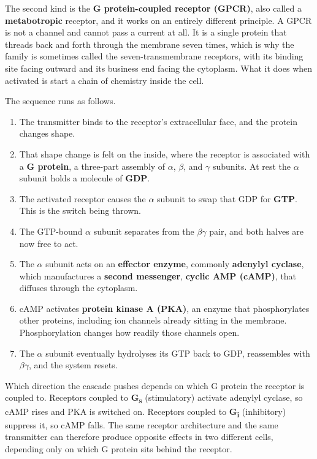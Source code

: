 \documentclass[11pt]{article}
\begin{document}
The second kind is the \textbf{G protein-coupled receptor (GPCR)}, also called a \textbf{metabotropic} receptor, and it works on an entirely different principle. A GPCR is not a channel and cannot pass a current at all. It is a single protein that threads back and forth through the membrane seven times, which is why the family is sometimes called the seven-transmembrane receptors, with its binding site facing outward and its business end facing the cytoplasm. What it does when activated is start a chain of chemistry inside the cell.

The sequence runs as follows.

\begin{enumerate}
    \item The transmitter binds to the receptor's extracellular face, and the protein changes shape.
    \item That shape change is felt on the inside, where the receptor is associated with a \textbf{G protein}, a three-part assembly of $\alpha$, $\beta$, and $\gamma$ subunits. At rest the $\alpha$ subunit holds a molecule of \textbf{GDP}.
    \item The activated receptor causes the $\alpha$ subunit to swap that GDP for \textbf{GTP}. This is the switch being thrown.
    \item The GTP-bound $\alpha$ subunit separates from the $\beta\gamma$ pair, and both halves are now free to act.
    \item The $\alpha$ subunit acts on an \textbf{effector enzyme}, commonly \textbf{adenylyl cyclase}, which manufactures a \textbf{second messenger}, \textbf{cyclic AMP (cAMP)}, that diffuses through the cytoplasm.
    \item cAMP activates \textbf{protein kinase A (PKA)}, an enzyme that phosphorylates other proteins, including ion channels already sitting in the membrane. Phosphorylation changes how readily those channels open.
    \item The $\alpha$ subunit eventually hydrolyses its GTP back to GDP, reassembles with $\beta\gamma$, and the system resets.
\end{enumerate}

Which direction the cascade pushes depends on which G protein the receptor is coupled to. Receptors coupled to \textbf{G\textsubscript{s}} (stimulatory) activate adenylyl cyclase, so cAMP rises and PKA is switched on. Receptors coupled to \textbf{G\textsubscript{i}} (inhibitory) suppress it, so cAMP falls. The same receptor architecture and the same transmitter can therefore produce opposite effects in two different cells, depending only on which G protein sits behind the receptor.
\end{document}
